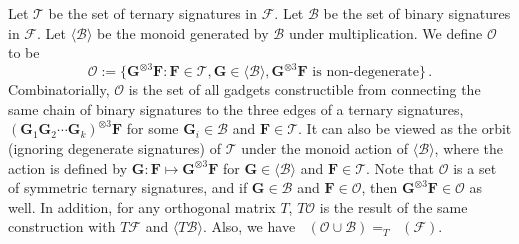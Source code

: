 \documentclass[11pt]{article}
\DeclareMathOperator{\holts}{Holant^*_3}
\newcommand{\teh}{^{\otimes 3}}
\begin{document}
Let $\mathcal{T}$ be the set of ternary signatures in $\mathcal{F}$.
Let $\mathcal{B}$ be the set of binary signatures in $\mathcal{F}$.
Let $\langle \mathcal{B} \rangle$ be the monoid generated by $\mathcal{B}$ under multiplication.
We define $\mathcal{O}$ to be
\begin{equation}\label{eq:g-set}
  \mathcal{O} := \{\mathbf{G}\teh \mathbf{F} : \mathbf{F} \in \mathcal{T}, \mathbf{G} \in \langle \mathcal{B} \rangle, \mathbf{G}\teh \mathbf{F} \text{ is non-degenerate} \} \, .
\end{equation}
Combinatorially, $\mathcal{O}$ is the set of all gadgets constructible from connecting the same chain of binary signatures to the three edges of a ternary signatures,
$(\mathbf{G}_1 \mathbf{G}_2 \cdots \mathbf{G}_k)\teh \mathbf{F}$ for some $\mathbf{G}_i \in \mathcal{B}$ and $\mathbf{F} \in \mathcal{T}$.
It can also be viewed as the orbit (ignoring degenerate signatures) of $\mathcal{T}$ under the monoid action of $\langle \mathcal{B} \rangle$, where the action is defined by $\mathbf{G} : \mathbf{F} \mapsto \mathbf{G} \teh \mathbf{F}$ for $\mathbf{G} \in \langle \mathcal{B} \rangle$ and $\mathbf{F} \in \mathcal{T}$.
Note that $\mathcal{O}$ is a set of symmetric ternary signatures, and if $\mathbf{G} \in \mathcal{B}$ and $\mathbf{F} \in \mathcal{O}$, then $\mathbf{G}\teh \mathbf{F} \in \mathcal{O}$ as well.
In addition, for any orthogonal matrix $T$, $T \mathcal{O}$ is the result of the same construction with $T \mathcal{F}$ and $\langle T \mathcal{B} \rangle$.
Also, we have $\holts(\mathcal{O} \cup \mathcal{B}) =_T \holts(\mathcal{F})$.
\end{document}
